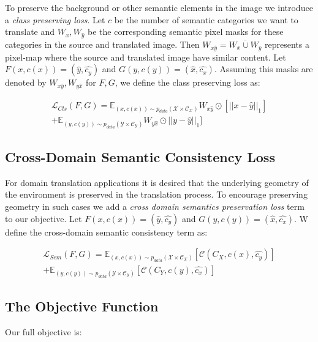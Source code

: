 To preserve the background or other semantic elements in the image we introduce a \textit{class preserving loss}. Let $c$ be the number of semantic categories we want to translate and $W_x, W_{\hat{y}}$ be the corresponding semantic pixel masks for these categories in the source and translated image. Then $W_{x\hat{y}} = \overline {W_x \cup W_{\hat{y}}}$ represents a pixel-map where the source and translated image have similar content. Let $F(x,c(x)) = (\hat{y},\hat{c_y})$ and $G(y,c(y)) = (\hat{x},\hat{c_x})$. Assuming this masks are denoted by $W_{x\hat{y}},W_{y\hat{x}}$ for $F,G$, we define the class preserving loss as:

\begin{equation}
\begin{aligned}
\mathcal{L}_{Cls}(F, G) = \mathbb{E}_{(x,c(x)) \sim p_{data}(\mathcal{X \times C_X})}W_{x\hat{y}}\odot[||x - \hat{y}||_1]  \\+ \mathbb{E}_{(y,c(y)) \sim p_{data}(\mathcal{Y \times C_Y})}W_{y\hat{x}}\odot||y- \hat{y}||_1 ] 
\end{aligned}
\label{eq:lossclasspreseve}
\end{equation}

\subsection{Cross-Domain Semantic Consistency Loss}
For domain translation applications it is desired that the underlying geometry of the environment is preserved in the translation process. To encourage preserving geometry in such cases we add a \textit{cross domain semantics preservation loss} term to our objective. Let $F(x,c(x)) = (\hat{y},\hat{c_y})$ and $G(y,c(y)) = (\hat{x},\hat{c_x})$. W define the cross-domain semantic consistency term as: 

\begin{equation}
\begin{aligned}
\mathcal{L}_{Sem}(F, G) = \mathbb{E}_{(x,c(x)) \sim p_{data}(\mathcal{X \times C_X})}[ \mathcal{C}(C_X,c(x),\hat{c_y})]  \\+ \mathbb{E}_{(y,c(y)) \sim p_{data}(\mathcal{Y \times C_Y})}[ \mathcal{C}(C_Y,c(y),\hat{c_x})] 
\end{aligned}
\label{eq:losssem}
\end{equation}

\subsection{The Objective Function}
Our full objective is:

